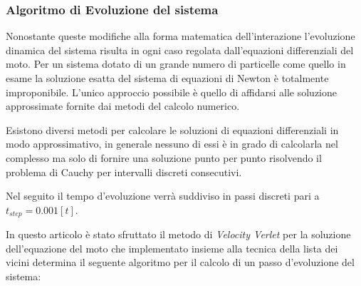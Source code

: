 \documentclass[11pt]{article}
\theoremstyle{plain}
\theoremstyle{remark}
\begin{document}
\subsubsection{Algoritmo di Evoluzione del sistema}
Nonostante queste modifiche alla forma matematica dell'interazione l'evoluzione dinamica del sistema risulta in ogni caso regolata dall'equazioni differenziali del moto.
Per un sistema dotato di un grande numero di particelle come quello in esame la soluzione esatta del sistema di equazioni di Newton è totalmente improponibile.
L'unico approccio possibile è quello di affidarsi alle soluzione approssimate fornite dai metodi del calcolo numerico.

Esistono diversi metodi per calcolare le soluzioni di equazioni differenziali in modo approssimativo, in generale nessuno di essi è in grado di calcolarla nel complesso ma solo di fornire una soluzione punto per punto risolvendo il problema di Cauchy per intervalli discreti consecutivi.

Nel seguito il tempo d'evoluzione verrà suddiviso in passi discreti pari a $t_{step} = 0.001 [t]$.


In questo articolo è stato sfruttato il metodo di \emph{Velocity Verlet} per la soluzione dell'equazione del moto che  implementato insieme alla tecnica della lista dei vicini determina il seguente algoritmo per il calcolo di un passo d'evoluzione del sistema:
\end{document}
